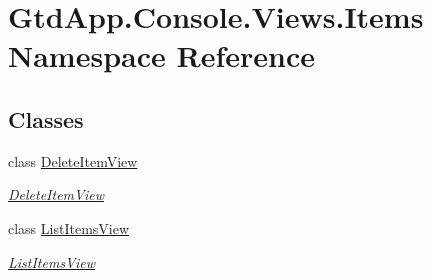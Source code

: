 \hypertarget{namespace_gtd_app_1_1_console_1_1_views_1_1_items}{}\section{Gtd\+App.\+Console.\+Views.\+Items Namespace Reference}
\label{namespace_gtd_app_1_1_console_1_1_views_1_1_items}
\subsection*{Classes}
\begin{DoxyCompactItemize}
\item 
class \mbox{\hyperlink{class_gtd_app_1_1_console_1_1_views_1_1_items_1_1_delete_item_view}{Delete\+Item\+View}}
\begin{DoxyCompactList}\small\item\em \mbox{\hyperlink{class_gtd_app_1_1_console_1_1_views_1_1_items_1_1_delete_item_view}{Delete\+Item\+View}} \end{DoxyCompactList}\item 
class \mbox{\hyperlink{class_gtd_app_1_1_console_1_1_views_1_1_items_1_1_list_items_view}{List\+Items\+View}}
\begin{DoxyCompactList}\small\item\em \mbox{\hyperlink{class_gtd_app_1_1_console_1_1_views_1_1_items_1_1_list_items_view}{List\+Items\+View}} \end{DoxyCompactList}\end{DoxyCompactItemize}
